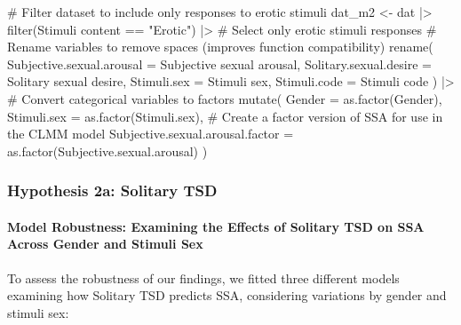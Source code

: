 \documentclass[
  bookmarksnumbered]{article}
\newenvironment{Shaded}{\begin{snugshade}}{\end{snugshade}}
\newcommand{\AttributeTok}[1]{\textcolor[rgb]{0.80,0.80,0.80}{#1}}
\newcommand{\CommentTok}[1]{\textcolor[rgb]{0.50,0.62,0.50}{#1}}
\newcommand{\FunctionTok}[1]{\textcolor[rgb]{0.94,0.94,0.56}{#1}}
\newcommand{\NormalTok}[1]{\textcolor[rgb]{0.80,0.80,0.80}{#1}}
\newcommand{\OtherTok}[1]{\textcolor[rgb]{0.94,0.94,0.56}{#1}}
\newcommand{\SpecialCharTok}[1]{\textcolor[rgb]{0.86,0.64,0.64}{#1}}
\newcommand{\StringTok}[1]{\textcolor[rgb]{0.80,0.58,0.58}{#1}}
\begin{document}
\begin{Shaded}
\begin{Highlighting}[]
\CommentTok{\# Filter dataset to include only responses to erotic stimuli}
\NormalTok{dat\_m2 }\OtherTok{\textless{}{-}}\NormalTok{ dat }\SpecialCharTok{|\textgreater{}}
  \FunctionTok{filter}\NormalTok{(}\StringTok{\textasciigrave{}}\AttributeTok{Stimuli content}\StringTok{\textasciigrave{}} \SpecialCharTok{==} \StringTok{"Erotic"}\NormalTok{) }\SpecialCharTok{|\textgreater{}} \CommentTok{\# Select only erotic stimuli responses}
  \CommentTok{\# Rename variables to remove spaces (improves function compatibility)}
  \FunctionTok{rename}\NormalTok{(}
    \AttributeTok{Subjective.sexual.arousal =} \StringTok{\textasciigrave{}}\AttributeTok{Subjective sexual arousal}\StringTok{\textasciigrave{}}\NormalTok{,}
    \AttributeTok{Solitary.sexual.desire =} \StringTok{\textasciigrave{}}\AttributeTok{Solitary sexual desire}\StringTok{\textasciigrave{}}\NormalTok{,}
    \AttributeTok{Stimuli.sex =} \StringTok{\textasciigrave{}}\AttributeTok{Stimuli sex}\StringTok{\textasciigrave{}}\NormalTok{,}
    \AttributeTok{Stimuli.code =} \StringTok{\textasciigrave{}}\AttributeTok{Stimuli code}\StringTok{\textasciigrave{}}
\NormalTok{  ) }\SpecialCharTok{|\textgreater{}}
  \CommentTok{\# Convert categorical variables to factors}
  \FunctionTok{mutate}\NormalTok{(}
    \AttributeTok{Gender =} \FunctionTok{as.factor}\NormalTok{(Gender),}
    \AttributeTok{Stimuli.sex =} \FunctionTok{as.factor}\NormalTok{(Stimuli.sex),}
    \CommentTok{\# Create a factor version of SSA for use in the CLMM model}
    \AttributeTok{Subjective.sexual.arousal.factor =} \FunctionTok{as.factor}\NormalTok{(Subjective.sexual.arousal)}
\NormalTok{  )}
\end{Highlighting}
\end{Shaded}

\subsubsection{Hypothesis 2a: Solitary TSD}\label{hyp2a}

\paragraph{Model Robustness: Examining the Effects of Solitary TSD on SSA Across Gender and Stimuli Sex}\label{model-robustness-examining-the-effects-of-solitary-tsd-on-ssa-across-gender-and-stimuli-sex}

To assess the robustness of our findings, we fitted three different models examining how Solitary TSD predicts SSA, considering variations by gender and stimuli sex:
\end{document}
